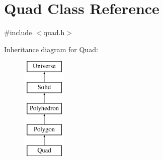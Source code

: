 \hypertarget{classQuad}{}\section{Quad Class Reference}
\label{classQuad}


{\ttfamily \#include $<$quad.\+h$>$}

Inheritance diagram for Quad\+:\begin{figure}[H]
\begin{center}
\leavevmode
\includegraphics[height=5.000000cm]{classQuad}
\end{center}
\end{figure}
